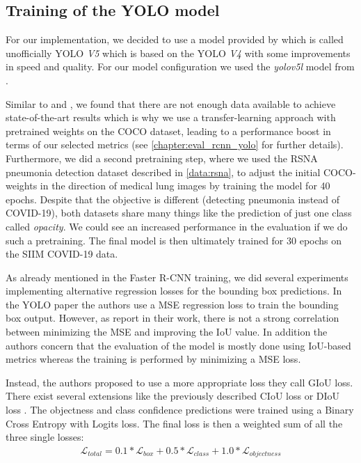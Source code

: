 \subsection*{Training of the \ac{YOLO} model}
For our implementation, we decided to use a model provided by \autocite{yolov5} which is called unofficially YOLO \textit{V5} which is based on the YOLO \textit{V4} with some improvements in speed and quality. For our model configuration we used the \textit{yolov5l} model from \autocite{yolov5}.

Similar to \autocite{CoronaDLTransfer} and  \autocite{mangal2020covidaid}, we found that there are not enough data available to achieve state-of-the-art results which is why we use a transfer-learning approach with pretrained weights on the COCO dataset, leading to a performance boost in terms of our selected metrics (see \vref{chapter:eval_rcnn_yolo} for further details). Furthermore, we did a second pretraining step, where we used the RSNA pneumonia detection dataset described in \vref{data:rsna}, to adjust the initial COCO-weights in the direction of medical lung images by training the model for 40 epochs. Despite that the objective is different (detecting pneumonia instead of COVID-19), both datasets share many things like the prediction of just one class called \textit{opacity}. We could see an increased performance in the evaluation if we do such a pretraining. The final model is then ultimately trained for 30 epochs on the SIIM COVID-19 data.

As already mentioned in the Faster \ac{R-CNN} training, we did several experiments implementing alternative regression losses for the bounding box predictions. In the \ac{YOLO} paper the authors use a \ac{MSE} regression loss to train the bounding box output. However, as \citeauthor{giou} \autocite{giou} report in their work, there is not a strong correlation between minimizing the \ac{MSE} and improving the \ac{IoU} value. In addition the authors concern that the evaluation of the model is mostly done using \ac{IoU}-based metrics whereas the training is performed by minimizing a \ac{MSE} loss.

Instead, the authors proposed to use a more appropriate loss they call \ac{GIoU} loss. There exist several extensions like the previously described \ac{CIoU} loss \autocite{zheng_enhancing_2021} or \ac{DIoU} loss \autocite{DIoU}.
The objectness and class confidence predictions were trained using a Binary Cross Entropy with Logits loss. The final loss is then a weighted sum of all the three single losses:
\begin{align}
	\mathcal{L}_{total} = 0.1 * \mathcal{L}_{box} + 0.5 * \mathcal{L}_{class} + 1.0 * \mathcal{L}_{objectness}
\end{align} 

